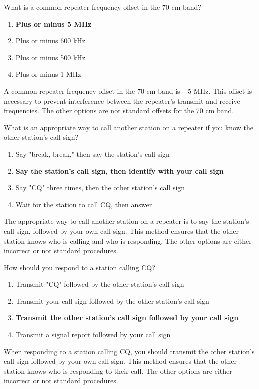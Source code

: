 \begin{tcolorbox}[colback=gray!10!white,colframe=black!75!black,title={T2A03}]
What is a common repeater frequency offset in the 70 cm band?
\begin{enumerate}[label=\Alph*),noitemsep]
    \item \textbf{Plus or minus 5 MHz}
    \item Plus or minus 600 kHz
    \item Plus or minus 500 kHz
    \item Plus or minus 1 MHz
\end{enumerate}
\end{tcolorbox}
A common repeater frequency offset in the 70 cm band is $\pm 5$ MHz. This offset is necessary to prevent interference between the repeater's transmit and receive frequencies. The other options are not standard offsets for the 70 cm band.

\begin{tcolorbox}[colback=gray!10!white,colframe=black!75!black,title={T2A04}]
What is an appropriate way to call another station on a repeater if you know the other station's call sign?
\begin{enumerate}[label=\Alph*),noitemsep]
    \item Say "break, break," then say the station's call sign
    \item \textbf{Say the station's call sign, then identify with your call sign}
    \item Say "CQ" three times, then the other station's call sign
    \item Wait for the station to call CQ, then answer
\end{enumerate}
\end{tcolorbox}
The appropriate way to call another station on a repeater is to say the station's call sign, followed by your own call sign. This method ensures that the other station knows who is calling and who is responding. The other options are either incorrect or not standard procedures.

\begin{tcolorbox}[colback=gray!10!white,colframe=black!75!black,title={T2A05}]
How should you respond to a station calling CQ?
\begin{enumerate}[label=\Alph*),noitemsep]
    \item Transmit "CQ" followed by the other station’s call sign
    \item Transmit your call sign followed by the other station’s call sign
    \item \textbf{Transmit the other station’s call sign followed by your call sign}
    \item Transmit a signal report followed by your call sign
\end{enumerate}
\end{tcolorbox}
When responding to a station calling CQ, you should transmit the other station’s call sign followed by your own call sign. This method ensures that the other station knows who is responding to their call. The other options are either incorrect or not standard procedures.

